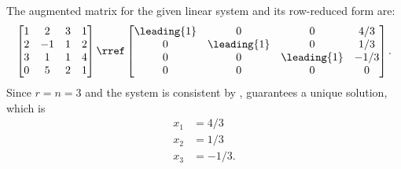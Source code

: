 The augmented matrix for the given linear system and its row-reduced form are:
\begin{align*}
\begin{bmatrix}
1 & 2 & 3 & 1\\
2 & -1 & 1 & 2\\
3 & 1 & 1 & 4\\
0 & 5 & 2 & 1
\end{bmatrix}
\rref
\begin{bmatrix}
\leading{1} & 0 & 0 & 4/3\\
0 & \leading{1} & 0 & 1/3\\
0 & 0 & \leading{1} & -1/3\\
0 & 0 & 0 & 0
\end{bmatrix}.
\end{align*}
Since $r = n = 3$ and the system is consistent by ,   guarantees a unique solution, which is
\begin{align*}
x_1 &= 4/3\\
x_2 &= 1/3\\
x_3 &= -1/3.
\end{align*}  